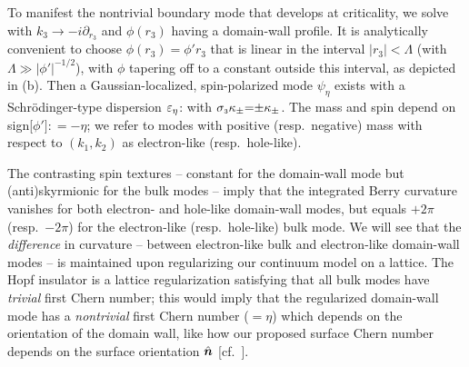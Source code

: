 \documentclass[aps,prl,showpacs,twocolumn,superscriptaddress]{revtex4-1}
\begin{document}
To manifest the nontrivial boundary mode that develops at criticality, we  solve   with $k_3{\rightarrow}{-}i\partial_{r_3}$ and $\phi(r_3)$ having a domain-wall profile.  It is analytically convenient to choose  $\phi(r_3)=\phi'r_3$ that is linear in the interval $|r_3|{<}\Lambda$ (with $\Lambda {\gg} |\phi'|^{\minus 1/2}$), with $\phi$ tapering off to a constant outside this interval, as depicted in (b). Then a  Gaussian-localized, spin-polarized  mode $\psi_{\eta}$ exists with a Schr\"odinger-type dispersion $\varepsilon_{\eta}$: 
with $\sigma_{\scriptscriptstyle{3}}{\kappa_{\pm}}{=}{\pm}{\kappa_{\pm}}$. The mass and spin depend on sign[$\phi']{:}{=}{-}\eta$; we refer to modes with positive (resp.\ negative) mass with respect to $(k_1,k_2)$ as electron-like (resp.\ hole-like). 



The contrasting spin textures -- constant for the domain-wall mode but (anti)skyrmionic for the bulk modes -- imply that the
integrated Berry curvature  vanishes for both electron- and hole-like domain-wall modes, but equals ${+}2\pi$ (resp.\ ${-}2\pi$)  for the electron-like (resp.\ hole-like) bulk mode. We will see that the \textit{difference} in curvature -- between electron-like bulk and electron-like domain-wall modes -- is maintained upon regularizing our continuum model on a lattice. The Hopf insulator is a lattice regularization  satisfying that all bulk modes have \textit{trivial} first Chern number; this would imply that the regularized domain-wall mode has a \textit{nontrivial} first Chern number  (${=}\eta$) which depends on the orientation of the domain wall, like how our proposed surface Chern number  depends on the surface orientation $\hat{\boldsymbol{n}}$ [cf.\ ]. 
\end{document}
